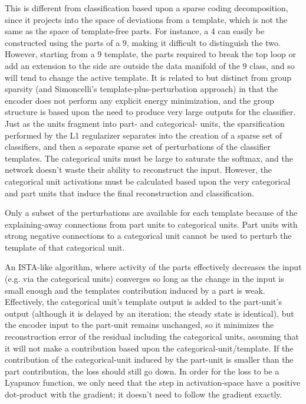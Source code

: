 This is different from classification based upon a sparse coding decomposition, since it projects into the space of deviations from a template, which is not the same as the space of template-free parts.  For instance, a 4 can easily be constructed using the parts of a 9, making it difficult to distinguish the two.  However, starting from a 9 template, the parts required to break the top loop or add an extension to the side are outside the data manifold of the 9 class, and so will tend to change the active template.  It is related to but distinct from group sparsity (and Simoncelli's template-plus-perturbation approach) in that the encoder does not perform any explicit energy minimization, and the group structure is based upon the need to produce very large outputs for the classifier.  Just as the units fragment into part- and categorical- units, the sparsification performed by the L1 regularizer separates into the creation of a sparse set of classifiers, and then a separate sparse set of perturbations of the classifier templates.  The categorical units must be large to saturate the softmax, and the network doesn't waste their ability to reconstruct the input.  However, the categorical unit activations must be calculated based upon the very categorical and part units that induce the final reconstruction and classification.

Only a subset of the perturbations are available for each template because of the explaining-away connections from part units to categorical units.  Part units with strong negative connections to a categorical unit cannot be used to perturb the template of that categorical unit.

An ISTA-like algorithm, where activity of the parts effectively decreases the input (e.g. via the categorical units) converges so long as the change in the input is small enough and the templates contribution induced by a part is weak.  Effectively, the categorical unit's template output is added to the part-unit's output (although it is delayed by an iteration; the steady state is identical), but the encoder input to the part-unit remains unchanged, so it minimizes the reconstruction error of the residual including the categorical units, assuming that it will not make a contribution based upon the categorical-unit/template.  If the contribution of the categorical-unit induced by the part-unit is smaller than the part contribution, the loss should still go down.  In order for the loss to be a Lyapunov function, we only need that the step in activation-space have a positive dot-product with the gradient; it doesn't need to follow the gradient exactly.

